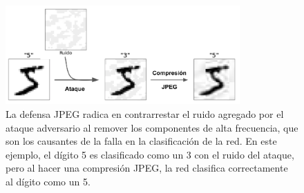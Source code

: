 \begin{figure}[h!]
    \centering
    \includegraphics[width=0.8\textwidth]{images/jpeg/jpegdefense_example.png}
    \caption{La defensa JPEG radica en contrarrestar el ruido agregado por el ataque adversario al remover los componentes de alta frecuencia, que son los causantes de la falla en la clasificación de la red. En este ejemplo, el dígito 5 es clasificado como un 3 con el ruido del ataque, pero al hacer una compresión JPEG, la red clasifica correctamente al dígito como un 5.}
    \label{jpegexample}
\end{figure}

